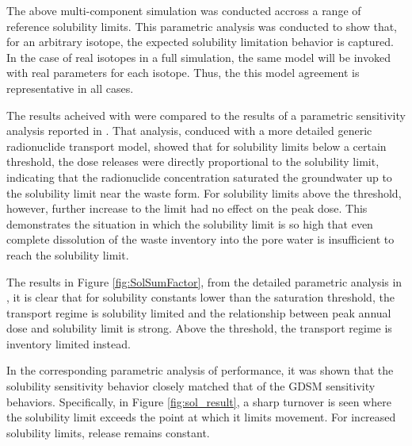 
The above multi-component simulation was conducted accross a range of 
reference solubility limits. This parametric analysis was conducted to show that, for an 
arbitrary isotope, the expected solubility limitation
behavior is captured. In the case of real isotopes in a full simulation, the 
same model will be invoked with real parameters for each isotope. Thus, the 
this model agreement is representative in all cases.

The results acheived with \Cyder were compared to the results of a parametric sensitivity 
analysis reported in \cite{huff_key_2012}. That analysis, conduced with a more 
detailed generic radionuclide transport model, showed that for solubility 
limits below a certain threshold, the dose releases were directly proportional 
to the solubility limit, indicating that the radionuclide concentration 
saturated the groundwater up to the solubility limit near the waste form.  For 
solubility limits above the threshold, however, further increase to the limit 
had no effect on the peak dose. This demonstrates the situation in which the 
solubility limit is so high that even complete dissolution of the waste 
inventory into the pore water is insufficient to reach the solubility limit.

The results in Figure \ref{fig:SolSumFactor}, from the detailed parametric 
analysis in \cite{huff_key_2012}, it is clear that for 
solubility constants lower than the saturation threshold, the transport regime is solubility 
limited and the relationship between peak annual dose and solubility limit is 
strong.  Above the threshold, the transport regime is inventory limited 
instead.

In the corresponding parametric analysis of \Cyder performance, it was shown that the 
solubility sensitivity behavior closely matched that of the \gls{GDSM} 
sensitivity behaviors. Specifically, in Figure \ref{fig:sol_result}, a sharp turnover 
is seen where the solubility limit exceeds the point at which it limits 
movement. For increased solubility limits, release remains constant.

